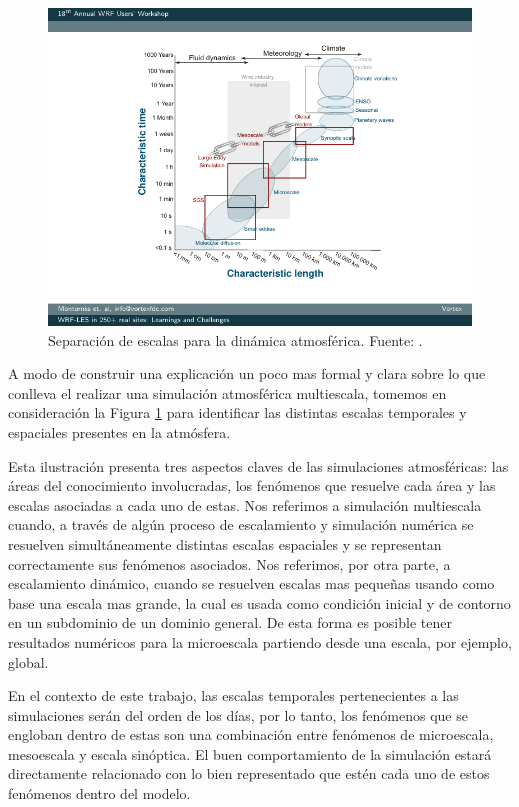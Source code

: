 \begin{figure}[h!]
	\centering
	\includegraphics[width=0.8\linewidth,trim={2.6cm 1.4cm 1.5cm 0.8cm},clip]{Imagenes/02/escalas}
	\caption{Separación de escalas para la dinámica atmosférica. Fuente: \cite{vortex2017}.}
	\label{fig:02_escalas}
\end{figure}

A modo de construir una explicación un poco mas formal y clara sobre lo que conlleva el realizar una simulación atmosférica multiescala, tomemos en consideración la Figura \ref{fig:02_escalas} para identificar las distintas escalas temporales y espaciales presentes en la atmósfera.

Esta ilustración presenta tres aspectos claves de las simulaciones atmosféricas: las áreas del conocimiento involucradas, los fenómenos que resuelve cada área y las escalas asociadas a cada uno de estas. Nos referimos a simulación multiescala cuando, a través de algún proceso de escalamiento y simulación numérica se resuelven simultáneamente distintas escalas espaciales y se representan correctamente sus fenómenos asociados. Nos referimos, por otra parte, a escalamiento dinámico, cuando se resuelven escalas mas pequeñas usando como base una escala mas grande, la cual es usada como condición inicial y de contorno en un subdominio de un dominio general. De esta forma es posible tener resultados numéricos para la microescala partiendo desde una escala, por ejemplo, global. 

En el contexto de este trabajo, las escalas temporales pertenecientes a las simulaciones serán del orden de los días, por lo tanto, los fenómenos que se engloban dentro de estas son una combinación entre fenómenos de microescala, mesoescala y escala sinóptica. El buen comportamiento de la simulación estará directamente relacionado con lo bien representado que estén cada uno de estos fenómenos dentro del modelo.

